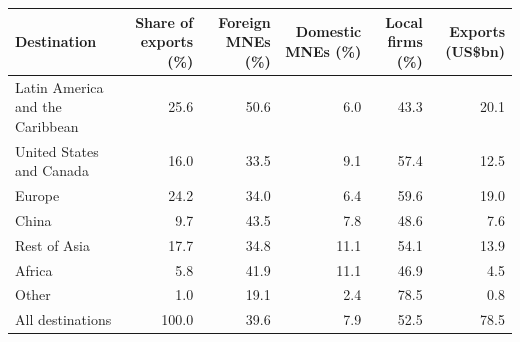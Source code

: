 \begin{tabular}{lrrrrr}
\toprule
Destination & Share of exports (\%) & Foreign MNEs (\%) & Domestic MNEs (\%) & Local firms (\%) & Exports (US\$bn) \\
\midrule
Latin America and the Caribbean & 25.6 & 50.6 & 6.0 & 43.3 & 20.1 \\
United States and Canada & 16.0 & 33.5 & 9.1 & 57.4 & 12.5 \\
Europe & 24.2 & 34.0 & 6.4 & 59.6 & 19.0 \\
China & 9.7 & 43.5 & 7.8 & 48.6 & 7.6 \\
Rest of Asia & 17.7 & 34.8 & 11.1 & 54.1 & 13.9 \\
Africa & 5.8 & 41.9 & 11.1 & 46.9 & 4.5 \\
Other & 1.0 & 19.1 & 2.4 & 78.5 & 0.8 \\
\midrule
All destinations & 100.0 & 39.6 & 7.9 & 52.5 & 78.5 \\
\bottomrule
\end{tabular}
